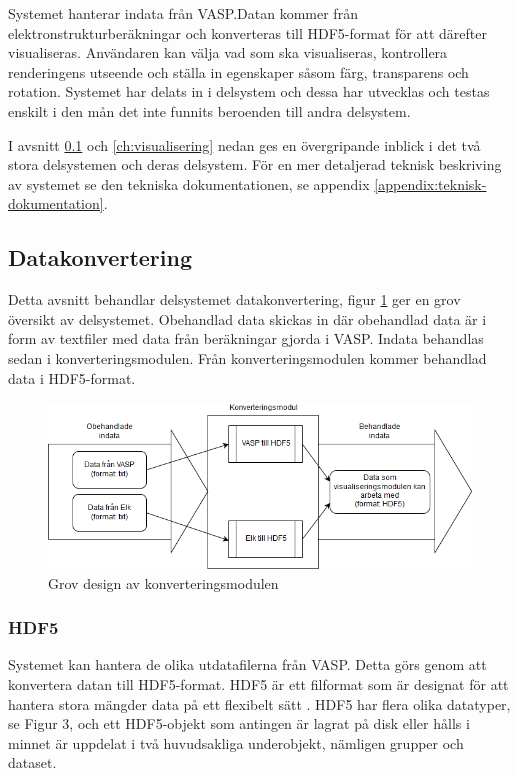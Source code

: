 \documentclass[a4paper,12pt]{article}
\begin{document}
Systemet hanterar indata från VASP.Datan kommer från elektronstrukturberäkningar och konverteras till HDF5-format för att därefter visualiseras. Användaren kan välja vad som ska visualiseras, kontrollera renderingens utseende och ställa in egenskaper såsom färg, transparens och rotation.
Systemet har delats in i delsystem och dessa har utvecklas och testas enskilt i den mån det inte funnits beroenden till andra delsystem.

I avsnitt \ref{ch:datakonvertering} och \ref{ch:visualisering} nedan ges en övergripande inblick i det två stora delsystemen och deras delsystem. För en mer detaljerad teknisk beskriving av systemet se den tekniska dokumentationen, se appendix \ref{appendix:teknisk-dokumentation}.

\subsection{Datakonvertering}
\label{ch:datakonvertering}
Detta avsnitt behandlar delsystemet datakonvertering, figur \ref{fig:konverteringdetalj} ger en grov översikt av delsystemet. Obehandlad data skickas in där obehandlad data är i form av textfiler med data från beräkningar gjorda i VASP. Indata behandlas sedan i konverteringsmodulen. Från konverteringsmodulen kommer behandlad data i HDF5-format.

\begin{figure}[H]
	\centering
	\includegraphics[scale=0.55]{konverteringdetalj.png}
	\caption{Grov design av konverteringsmodulen}
	\label{fig:konverteringdetalj}
\end{figure}

\subsubsection{HDF5}
Systemet kan hantera de olika utdatafilerna från VASP. Detta görs genom att konvertera datan till HDF5-format.
HDF5 är ett filformat som är designat för att hantera stora mängder data på ett flexibelt sätt \cite{hdf5}.
HDF5 har flera olika datatyper, se Figur 3, och ett HDF5-objekt som antingen är lagrat på disk eller hålls i minnet är uppdelat i två huvudsakliga underobjekt, nämligen grupper och dataset.
\end{document}
